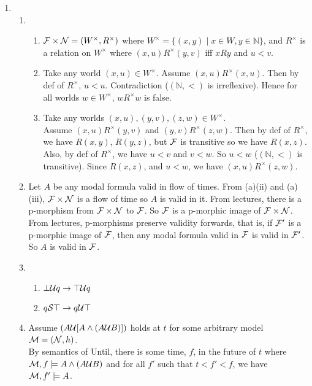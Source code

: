 \documentclass[a4paper, draft, 12pt]{article}
\begin{document}
\begin{enumerate}
\begin{enumerate}
\begin{enumerate}
  \end{enumerate}

\end{enumerate}
\item %
\begin{enumerate}
\item %
  \begin{enumerate}
  \item %
  $\mathcal{F} \times \mathcal{N} = (W^{\times}, R^{\times})$ where $W^{\times} = \{ (x,y) \;|\; x \in W, y \in \mathbb{N} \}$, 
  and $R^{\times}$ is a relation on $W^{\times}$ where $(x,u)R^{\times}(y,v)$ iff $xRy$ and $u < v$.  
  \item %
  Take any world $(x,u) \in W^{\times}$. Assume $(x,u)R^{\times}(x,u)$. Then by def of $R^{\times}$, $u < u$. Contradiction ($(\mathbb{N}, <)$ is irreflexive). Hence for all worlds $w \in W^{\times}$, $wR^{\times}w$ is false.
  \item %
  Take any worlds $(x,u), (y,v), (z,w) \in W^{\times}$. \\
  Assume $(x,u)R^{\times}(y,v)$ and $(y,v)R^{\times}(z,w)$. 
  Then by def of $R^{\times}$, we have $R(x,y)$, $R(y,z)$, but $\mathcal{F}$ is transitive so we have $R(x,z)$. 
  Also, by def of $R^{\times}$, we have $u < v$ and $v < w$. So $u < w$ ($(\mathbb{N}, <)$ is transitive). 
  Since $R(x,z)$, and $u < w$, we have $(x,u)R^{\times}(z,w)$. 
  \end{enumerate}
\item %
  Let $A$ be any modal formula valid in flow of times. 
  From (a)(ii) and (a)(iii), $\mathcal{F} \times \mathcal{N}$ is a flow of time so $A$ is valid in it. 
  From lectures, there is a p-morphism from $\mathcal{F} \times \mathcal{N}$ to $\mathcal{F}$. So 
  $\mathcal{F}$ is a p-morphic image of $\mathcal{F} \times \mathcal{N}$.
  From lectures, p-morphisms preserve validity forwards, that is, if $\mathcal{F}'$ is a 
  p-morphic image of $\mathcal{F}$, then any modal formula valid in $\mathcal{F}$ is valid in $\mathcal{F}'$. 
  So $A$ is valid in $\mathcal{F}$. 
\item %
  \begin{enumerate}
  \item $\bot \mathcal{U} q \rightarrow \top \mathcal{U} q$
  \item $q \mathcal{S} \top \rightarrow q \mathcal{U} \top $
  \end{enumerate}
\item %
  Assume $(A \mathcal{U} [A \wedge (A \mathcal{U} B)])$ holds at $t$ for some arbitrary model $\mathcal{M} = (\mathcal{N},h)$. \\
  By semantics of Until, there is some time, $f$, in the future of $t$
  where $\mathcal{M}, f \models A \wedge (A \mathcal{U} B)$
  and for all $f'$ such that $t< f' < f$, we have $\mathcal{M}, f' \models A$.


\end{enumerate}
\end{enumerate}
\end{document}
